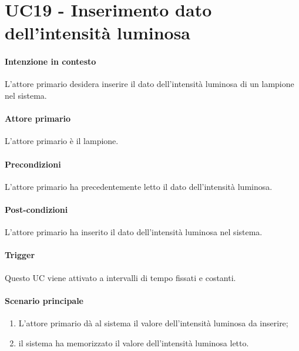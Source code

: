 \section{UC19 - Inserimento dato dell'intensità luminosa}\label{uc:19}
\paragraph{Intenzione in contesto} L'attore primario desidera inserire il dato dell'intensità luminosa di un lampione nel sistema.
\paragraph{Attore primario} L'attore primario è il lampione.
\paragraph{Precondizioni} L'attore primario ha precedentemente letto il dato dell'intensità luminosa.
\paragraph{Post-condizioni} L'attore primario ha inserito il dato dell'intensità luminosa nel sistema.
\paragraph{Trigger} Questo UC viene attivato a intervalli di tempo fissati e costanti.
\paragraph{Scenario principale}
\begin{enumerate}
    \item L'attore primario dà al sistema il valore dell'intensità luminosa da inserire;
    \item il sistema ha memorizzato il valore dell'intensità luminosa letto.
\end{enumerate}